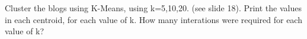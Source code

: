 Cluster the blogs using K-Means, using k=5,10,20. (see slide
18).  Print the values in each centroid, for each value of k.  How many interations were required for each value of k?